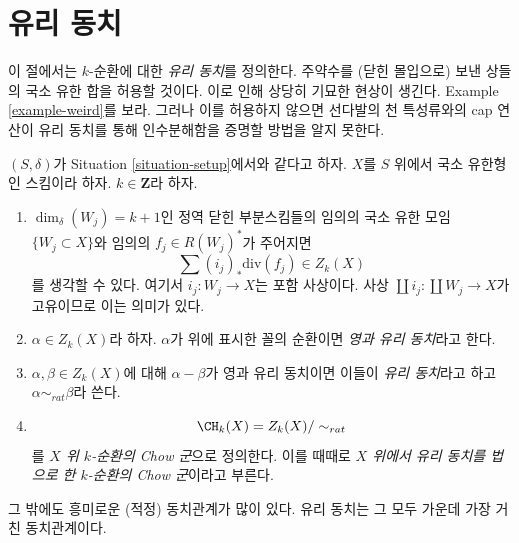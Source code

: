 \section{유리 동치}
\label{section-rational-equivalence}

\noindent
이 절에서는 $k$-순환에 대한 {\it 유리 동치}를 정의한다. 주약수를
(닫힌 몰입으로) 보낸 상들의 국소 유한 합을 허용할 것이다. 이로 인해
상당히 기묘한 현상이 생긴다. Example \ref{example-weird}를 보라.
그러나 이를 허용하지 않으면 선다발의 천 특성류와의 cap 연산이 유리
동치를 통해 인수분해함을 증명할 방법을 알지 못한다.

\begin{definition}
\label{definition-rational-equivalence}
$(S, \delta)$가 Situation \ref{situation-setup}에서와 같다고 하자.
$X$를 $S$ 위에서 국소 유한형인 스킴이라 하자. $k \in \mathbf{Z}$라 하자.
\begin{enumerate}
\item $\dim_\delta(W_j) = k + 1$인 정역 닫힌 부분스킴들의 임의의 국소
유한 모임 $\{W_j \subset X\}$와 임의의 $f_j \in R(W_j)^*$가 주어지면
$$
\sum (i_j)_*\text{div}(f_j) \in Z_k(X)
$$
를 생각할 수 있다. 여기서 $i_j : W_j \to X$는 포함 사상이다. 사상
$\coprod i_j : \coprod W_j \to X$가 고유이므로 이는 의미가 있다.
\item $\alpha \in Z_k(X)$라 하자. $\alpha$가 위에 표시한 꼴의
순환이면 {\it 영과 유리 동치}라고 한다.
\item $\alpha, \beta \in Z_k(X)$에 대해 $\alpha - \beta$가 영과 유리
동치이면 이들이 {\it 유리 동치}라고 하고 $\alpha \sim_{rat} \beta$라
쓴다.
\item
$$
\CH_k(X) = Z_k(X) / \sim_{rat}
$$
를 {\it $X$ 위 $k$-순환의 Chow 군}으로 정의한다. 이를 때때로
{\it $X$ 위에서 유리 동치를 법으로 한 $k$-순환의 Chow 군}이라고
부른다.
\end{enumerate}
\end{definition}

\noindent
그 밖에도 흥미로운 (적정) 동치관계가 많이 있다. 유리 동치는 그 모두
가운데 가장 거친 동치관계이다.

